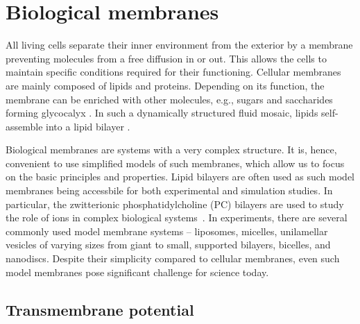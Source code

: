 \chapter{Biological membranes}
\label{chap:intro}


All living cells separate their inner environment from the exterior by a membrane 
preventing molecules from a free diffusion in or out. 
This allows the cells to maintain specific conditions required for their functioning. 
Cellular membranes are mainly composed of lipids and proteins. 
Depending on its function, the membrane can be enriched with other molecules, e.g., sugars and saccharides forming glycocalyx \citep{reitsma07}. 
In such a dynamically structured fluid mosaic,  %
lipids self-assemble into a lipid bilayer \citep{vereb03,Mouritsen2011,Vattulainen2011}.

Biological membranes are systems with a very complex structure. 
It is, hence, convenient to use simplified models of such membranes, 
which allow us to focus on the basic principles and properties. 
Lipid bilayers are often used as such model membranes 
being accessbile for both experimental and simulation studies. 
In particular, the zwitterionic phosphatidylcholine (PC) bilayers are
used to study the role of ions in complex biological
systems~\citep{scherer87,seelig90,cevc90}.
In experiments, there are several commonly used model membrane systems --
liposomes, 
micelles, 
unilamellar vesicles of varying sizes from giant to small, 
supported bilayers,
bicelles,
and nanodiscs. \citep{keller2017, MolBiolCell, marsh13}
Despite their simplicity compared to cellular membranes,
even such model membranes pose significant challenge for science today. 
\citep{pohl18, melcrova16, javanainen17, magarkar2017, botan15, catte16, Kulig14b, Kulig14, Pluhackova2016, vacha09a}




\section{Transmembrane potential}

